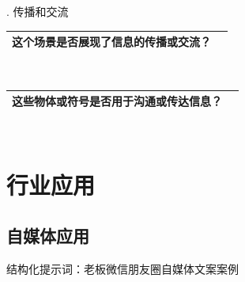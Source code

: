 \documentclass[12pt]{book}
\begin{document}
. 传播和交流

\begin{tabular}{|p{15cm}|p{3cm}|}
	\hline
这个场景是否展现了信息的传播或交流？\\
	\hline
\end{tabular}\\


\begin{tabular}{|p{15cm}|p{3cm}|}
	\hline
这些物体或符号是否用于沟通或传达信息？\\
	\hline
\end{tabular}\\


\chapter{行业应用}
\section{自媒体应用}
\bigskip
结构化提示词：老板微信朋友圈自媒体文案案例
\end{document}
